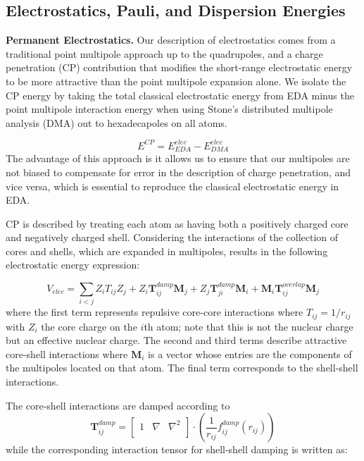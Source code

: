 \documentclass[journal=jctcce,manuscript=article]{achemso}
\begin{document}
\subsection*{Electrostatics, Pauli, and Dispersion Energies}
\textbf{Permanent Electrostatics.} Our description of electrostatics comes from a traditional point multipole approach up to the quadrupoles, and a charge penetration (CP) contribution that modifies the short-range electrostatic energy to be more attractive than the
point multipole expansion alone. We isolate the CP energy by taking the total classical electrostatic energy from EDA minus the point multipole interaction energy
when using Stone's distributed multipole analysis (DMA)\cite{stone1981distributed,stone1985distributeda}
out to hexadecapoles on all atoms.

\begin{equation}
  E^{CP}=E^{elec}_{EDA}-E^{elec}_{DMA}
  \label{eq:cp}
\end{equation}
The advantage of this approach is it allows us to ensure that our multipoles are not biased to compensate for error in the description of charge penetration, and vice versa, which is essential to reproduce the classical electrostatic energy in EDA.

CP is described by treating each atom as having both a positively charged core and negatively charged shell. Considering the interactions of the collection of cores and shells, which are expanded in multipoles,
results in the following electrostatic energy expression:

\begin{equation}
  V_{elec}=\sum_{i<j}Z_iT_{ij}Z_j+Z_i\bm{T}_{ij}^{damp}\bm{M}_j+Z_j\bm{T}_{ji}^{damp}\bm{M}_i+\bm{M}_i\bm{T}_{ij}^{overlap}\bm{M}_j
  \label{eq:elec}
\end{equation}
where the first term represents repulsive core-core interactions where $T_{ij}=1/r_{ij}$
with $Z_i$ the core charge on the $i$th atom; note that this is not the nuclear charge but an effective
nuclear charge. The second and third terms describe attractive core-shell interactions where $\bm{M}_i$ is
a vector whose entries are the components of the multipoles located on that atom. The final term corresponds to the shell-shell interactions.

The core-shell interactions are damped according to
\begin{equation}
  \bm{T}_{ij}^{damp}=
  \begin{bmatrix}
    1 & \nabla & \nabla^2 \\
  \end{bmatrix}\cdot
  \left(\frac{1}{r_{ij}}f_{ij}^{damp}(r_{ij})\right)
  \label{eq:T_damp}
\end{equation}
\noindent
while the corresponding interaction tensor for shell-shell damping is written as:
\end{document}
